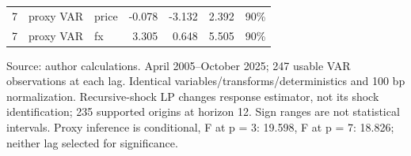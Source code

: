 \begin{table}[htbp]
\begin{tabularx}{\linewidth}{rXlrrrl}
7 & proxy VAR & price & -0.078 & -3.132 & 2.392 & 90\% \\
7 & proxy VAR & fx & 3.305 & 0.648 & 5.505 & 90\% \\
\bottomrule
\end{tabularx}
\par\vspace{3pt}\begin{minipage}{\linewidth}\footnotesize Source: author calculations.\allowbreak{} April 2005–October 2025; 247 usable VAR observations at each lag.\allowbreak{} Identical variables/transforms/deterministics and 100 bp normalization.\allowbreak{} Recursive-shock LP changes response estimator, not its shock identification; 235 supported origins at horizon 12.\allowbreak{} Sign ranges are not statistical intervals.\allowbreak{} Proxy inference is conditional, F at p = 3: 19.\allowbreak{}598, F at p = 7: 18.\allowbreak{}826; neither lag selected for significance.\allowbreak{}\end{minipage}
\end{table}
